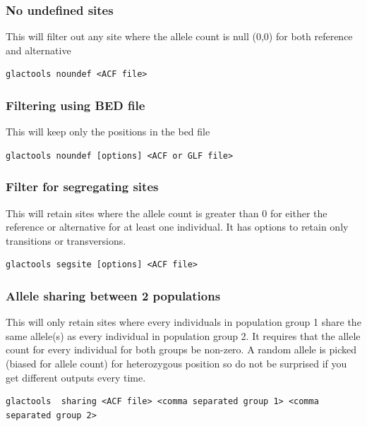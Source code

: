 \documentclass[a4paper]{article}
\begin{document}
\subsubsection{No undefined sites}

\noindent This will filter out any site where the allele count is null (0,0) for both reference and alternative

\begin{lstlisting}
glactools noundef <ACF file>
\end{lstlisting}


\subsubsection{Filtering using BED file}

\noindent This will keep only the positions in the bed file

\begin{lstlisting}
glactools noundef [options] <ACF or GLF file>
\end{lstlisting}

\subsubsection{Filter for segregating sites}

\noindent This will retain sites where the allele count is greater than 0 for either the reference or alternative for at least one individual. It has options to retain only transitions or transversions. 

\begin{lstlisting}
glactools segsite [options] <ACF file>
\end{lstlisting}

\subsubsection{Allele sharing between 2 populations}

\noindent This will only retain sites where every individuals in population group 1 share the same allele(s) as every individual in population group 2.
It requires that the allele count for every individual for both groups be non-zero.
A random allele is picked (biased for allele count) for heterozygous position so do not be surprised if you get different outputs every time.

\tiny
\begin{lstlisting}
glactools  sharing <ACF file> <comma separated group 1> <comma separated group 2>
\end{lstlisting}
\normalsize
\end{document}
